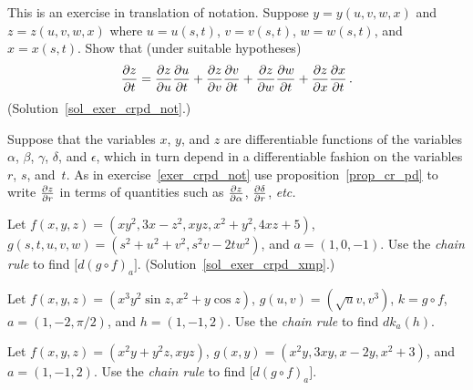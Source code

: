 \begin{exer}\label{exer_crpd_not}  This is an exercise in translation of notation.  Suppose
$y = y(u,v,w,x)$ and $z = z(u,v,w,x)$ where $u = u(s,t)$, $v = v(s,t)$, $w = w(s,t)$, and $x =
x(s,t)$.  Show that (under suitable hypotheses)
  \[ \frac{\partial z}{\partial t} = \frac{\partial z}{\partial u}\frac{\partial u}{\partial t} + \frac{\partial z}{\partial v}\frac{\partial v}{\partial t} + \frac{\partial z}{\partial w}\frac{\partial w}{\partial t} + \frac{\partial z}{\partial x}\frac{\partial x}{\partial t}\,. \]
(Solution~\ref{sol_exer_crpd_not}.)
\end{exer}

\begin{prob}  Suppose that the variables $x$, $y$, and $z$ are differentiable functions of the
variables $\alpha$, $\beta$, $\gamma$, $\delta$, and $\epsilon$, which in turn depend in a
differentiable fashion on the variables $r$, $s$, and~$t$.  As in exercise~\ref{exer_crpd_not}
use proposition~\ref{prop_cr_pd} to write $\frac{\partial z}{\partial r}$ in terms of quantities such as $\frac{\partial z}{\partial\alpha}$, $\frac{\partial\delta}{\partial r}$, \emph{etc.}
\end{prob}

\begin{exer}\label{exer_crpd_xmp}  Let $f(x,y,z) = (xy^2, 3x - z^2, xyz, x^2 + y^2, 4xz + 5)$,
$g(s,t,u,v,w) = (s^2 + u^2 + v^2, s^2v - 2tw^2)$, and $a = (1,0,-1)$.  Use the \emph{chain
rule} to find $\bigl[d(g \circ f)_a\bigr]$. (Solution~\ref{sol_exer_crpd_xmp}.)
\end{exer}

\begin{prob}  Let $f(x,y,z) = (x^3y^2\sin z, x^2 + y\cos z)$, $g(u,v) = (\sqrt uv, v^3)$,
$k = g \circ f$, $a = (1,-2,\pi/2)$, and $h = (1,-1,2)$.  Use the \emph{chain rule} to find
$dk_a(h)$.
\end{prob}

\begin{prob}  Let $f(x,y,z) = (x^2y + y^2z, xyz)$, $g(x,y) = (x^2y, 3xy, x - 2y, x^2 + 3)$,
and $a = (1,-1,2)$.  Use the \emph{chain rule} to find $\bigl[d(g \circ f)_a\bigr]$.
\end{prob}

